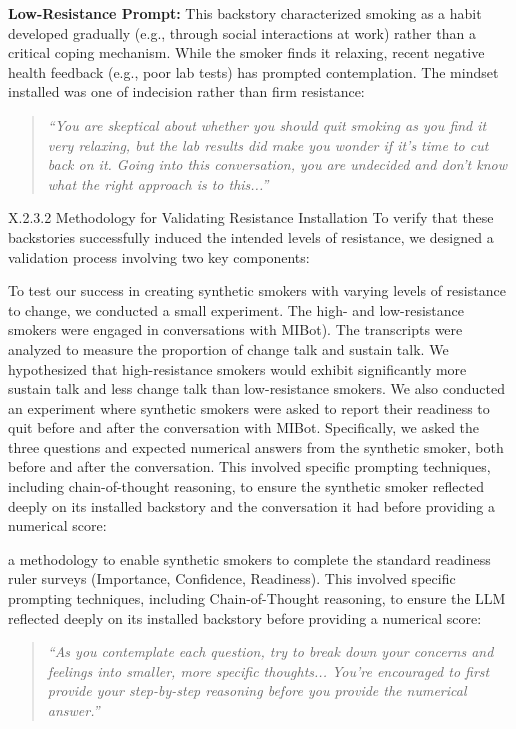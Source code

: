 \textbf{Low-Resistance Prompt:} This backstory characterized smoking as a habit developed gradually (e.g., through social interactions at work) rather than a critical coping mechanism. While the smoker finds it relaxing, recent negative health feedback (e.g., poor lab tests) has prompted contemplation. The mindset installed was one of indecision rather than firm resistance:

\begin{quote}
\textit{``You are skeptical about whether you should quit smoking as you find it very relaxing, but the lab results did make you wonder if it's time to cut back on it. Going into this conversation, you are undecided and don't know what the right approach is to this...''}  
\end{quote}


X.2.3.2 Methodology for Validating Resistance Installation
To verify that these backstories successfully induced the intended levels of resistance, we designed a validation process involving two key components:

To test our success in creating synthetic smokers with varying levels of resistance to change, we conducted a small experiment. The high- and low-resistance smokers were engaged in conversations with MIBot). The transcripts were analyzed to measure the proportion of change talk and sustain talk. We hypothesized that high-resistance smokers would exhibit significantly more sustain talk and less change talk than low-resistance smokers. We also conducted an experiment where synthetic smokers were asked to report their readiness to quit before and after the conversation with MIBot. Specifically, we asked the three questions and expected numerical answers from the synthetic smoker, both before and after the conversation.  This involved specific prompting techniques, including chain-of-thought reasoning, to ensure the synthetic smoker reflected deeply on its installed backstory and the conversation it had before providing a numerical score:

a methodology to enable synthetic smokers to complete the standard readiness ruler surveys (Importance, Confidence, Readiness). This involved specific prompting techniques, including Chain-of-Thought reasoning, to ensure the LLM reflected deeply on its installed backstory before providing a numerical score:

\begin{quote}
    \textit{``As you contemplate each question, try to break down your concerns and feelings into smaller, more specific thoughts... You're encouraged to first provide your step-by-step reasoning before you provide the numerical answer.''}
\end{quote}



